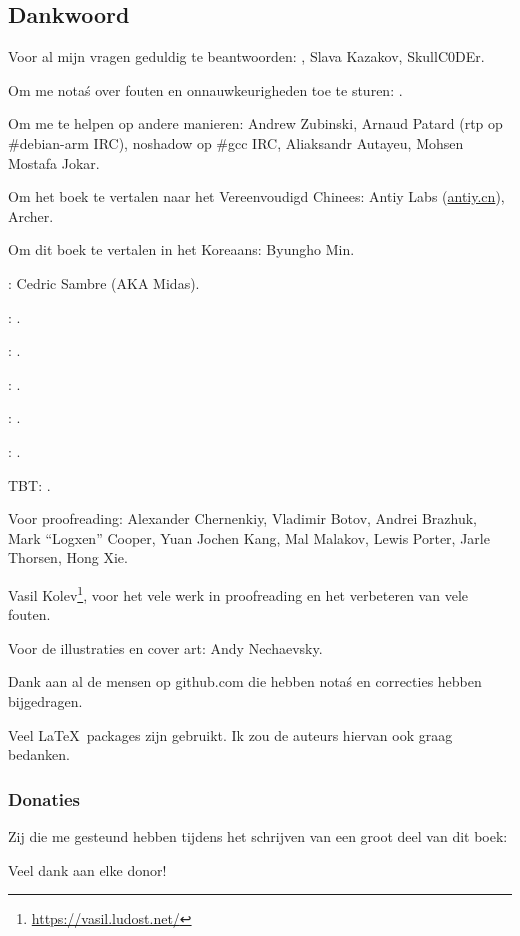 \subsection*{Dankwoord}

Voor al mijn vragen geduldig te beantwoorden: \HERMIT, Slava  Kazakov, SkullC0DEr.

Om me nota\'s over fouten en onnauwkeurigheden toe te sturen: \PeopleMistakesInaccuracies{}.

Om me te helpen op andere manieren:
Andrew Zubinski,
Arnaud Patard (rtp op \#debian-arm IRC),
noshadow op \#gcc IRC,
Aliaksandr Autayeu, Mohsen Mostafa Jokar.

Om het boek te vertalen naar het Vereenvoudigd Chinees:
Antiy Labs (\href{http://antiy.cn}{antiy.cn}), Archer.

Om dit boek te vertalen in het Koreaans: Byungho Min.

\NLph{}: Cedric Sambre (AKA Midas).

\NLph{}: \PeopleSpanishTranslators{}.

\NLph{}: \PeoplePTBRTranslators{}.

\NLph{}: \PeopleItalianTranslators{}.

\NLph{}: \PeopleFrenchTranslators{}.

\NLph{}: \PeopleGermanTranslators{}.

\ac{TBT}: \PeoplePolishTranslators{}.


Voor proofreading:
Alexander  Chernenkiy,
Vladimir Botov,
Andrei Brazhuk,
Mark ``Logxen'' Cooper, Yuan Jochen Kang, Mal Malakov, Lewis Porter, Jarle Thorsen, Hong Xie.

Vasil Kolev\footnote{\url{https://vasil.ludost.net/}}, voor het vele werk in proofreading en het verbeteren van vele fouten.

Voor de illustraties en cover art: Andy Nechaevsky.

Dank aan al de mensen op github.com die hebben nota\'s en correcties hebben bijgedragen\FNGithubContributors{}.

Veel \LaTeX\ packages zijn gebruikt. Ik zou de auteurs hiervan ook graag bedanken.

\subsubsection*{Donaties}

Zij die me gesteund hebben tijdens het schrijven van een groot deel van dit boek:



Veel dank aan elke donor!
